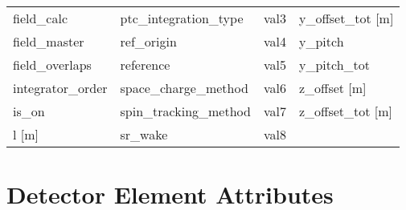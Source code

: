 \begin{tabular}{llll}
field_calc                     & ptc_integration_type           & val3                           & y_offset_tot [m]               \\
field_master                   & ref_origin                     & val4                           & y_pitch                        \\
field_overlaps                 & reference                      & val5                           & y_pitch_tot                    \\
integrator_order               & space_charge_method            & val6                           & z_offset [m]                   \\
is_on                          & spin_tracking_method           & val7                           & z_offset_tot [m]               \\
l [m]                          & sr_wake                        & val8                           &                                \\
 \bottomrule
 \end{tabular}
 \vfill
 
 \section{Detector Element Attributes}
 \label{s:list.detector}
 
